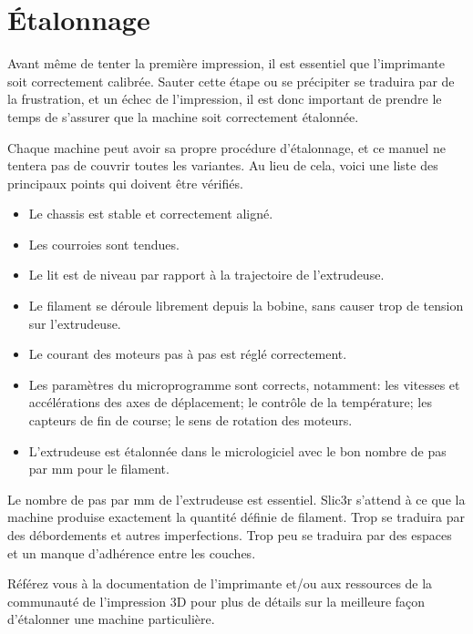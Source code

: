 
\section{\'Etalonnage}
\label{calibration}

Avant m\^eme de tenter la premi\`ere impression, il est essentiel que l'imprimante soit correctement calibr\'ee. Sauter cette \'etape ou se pr\'ecipiter se traduira par de la frustration, et un \'echec de l'impression, il est donc important de prendre le temps de s'assurer que la machine soit correctement \'etalonn\'ee.

Chaque machine peut avoir sa propre proc\'edure d'\'etalonnage, et ce manuel ne tentera pas de couvrir toutes les variantes. Au lieu de cela, voici une liste des principaux points qui doivent \^etre v\'erifi\'es.

\begin{itemize}
\item Le chassis est stable et correctement align\'e.
\item Les courroies sont tendues.
\item Le lit est de niveau par rapport \`a la trajectoire de l'extrudeuse.
\item Le filament se d\'eroule librement depuis la bobine, sans causer trop de tension sur l'extrudeuse.
\item Le courant des moteurs pas \`a pas est r\'egl\'e correctement.
\item Les param\`etres du microprogramme sont corrects, notamment: les vitesses et acc\'el\'erations des axes de d\'eplacement; le contr\^ole de la temp\'erature; les capteurs de fin de course; le sens de rotation des moteurs.
\item L'extrudeuse est \'etalonn\'ee dans le micrologiciel avec le bon nombre de pas par mm pour le filament.
\end{itemize}

Le nombre de pas par mm de l'extrudeuse est essentiel. Slic3r s'attend \`a ce que la machine produise exactement la quantit\'e d\'efinie de filament. Trop se traduira par des d\'ebordements et autres imperfections. Trop peu se traduira par des espaces et un manque d'adh\'erence entre les couches.

R\'ef\'erez vous \`a la documentation de l'imprimante et/ou aux ressources de la communaut\'e de l'impression 3D pour plus de d\'etails sur la meilleure fa\c{c}on d'\'etalonner une machine particuli\`ere.
